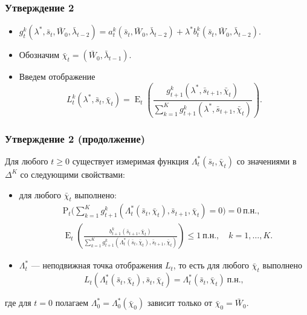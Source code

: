 \documentclass[10pt]{beamer}
\theoremstyle{definition}
\theoremstyle{remark}
\DeclareMathOperator{\E}{E}
\renewcommand{\P}{\mathrm{P}}
\begin{document}
    \begin{frame}\frametitle{Утверждение 2}
    \begin{itemize}
    \item $
        g_{t}^k(\lambda^*, \bar s_t, \bar W_0,\bar\lambda_{t-2}) 
        = a_{t}^k(\bar s_t,\bar W_0,\bar\lambda_{t-2}) + \lambda^* b_{t}^k(\bar s_t,\bar W_0,\bar\lambda_{t-2}).
        $

    \item Обозначим $\bar \chi_t=(\bar W_0,\bar\lambda_{t-1}).$
    \item Введем отображение
        \[
        L_{t}^k(\lambda^*, \bar s_t,\bar\chi_t) 
        = \E_t\left(
          \frac{g_{t+1}^k(\lambda^*,\bar s_{t+1},\bar\chi_t)}
               {\sum_{k=1}^K g_{t+1}^k(\lambda^*,\bar s_{t+1},\bar\chi_t)} 
          \right).
        \]
    \end{itemize}

\end{frame}


\begin{frame}\frametitle{Утверждение 2 (продолжение)}
\begin{proposition}
    \label{lemma2-lambda-star}
    Для любого $t\ge0$ существует измеримая функция $\Lambda_t^*(\bar s_t,\bar\chi_t)$ со значениями в  $\Delta^K$ со следующими свойствами:
    \begin{itemize}
    \item для любого $\bar\chi_t$ выполнено:
    \begin{align}
    \label{12-lambda-star-g}
    &\P_t\Biggl(
        \sum_{k=1}^K g_{t+1}^k(\Lambda_t^*(\bar s_t,\bar\chi_t),\bar s_{t+1},\bar\chi_t) = 0
      \Biggr) = 0\ \text{п.н.},\\
    \label{13-lambda-star-inequality}
    &\E_t\left( 
      \frac{b_{t+1}^k(\bar s_{t+1},\bar\chi_t)}
           {\sum_{k=1}^K g_{t+1}^k(\Lambda^*_t(\bar s_{t},\bar\chi_t), \bar s_{t+1},\bar\chi_t)}
      \right) \le 1\ \text{п.н.}, \quad k=1,\dots,K.
    \end{align}
    
    \item $\Lambda_t^*$ — неподвижная точка отображения $L_t$, то есть для любого $\bar\chi_t$ выполнено
    \begin{equation}
    \label{14-lambda-star-fixed-point}
    L_{t}(\Lambda_{t}^*(\bar s_t,\bar\chi_t), \bar s_t, \bar\chi_t) 
    = \Lambda^*_{t}(\bar s_t,\bar\chi_t)\ \text{п.н.}, 
    \end{equation}
    \end{itemize}
    где для $t=0$ полагаем $\Lambda_0^*=\Lambda^*_0(\bar\chi_0)$ зависит только от $\bar\chi_0=\bar W_0$.
    \end{proposition}
\end{frame}
\end{document}

